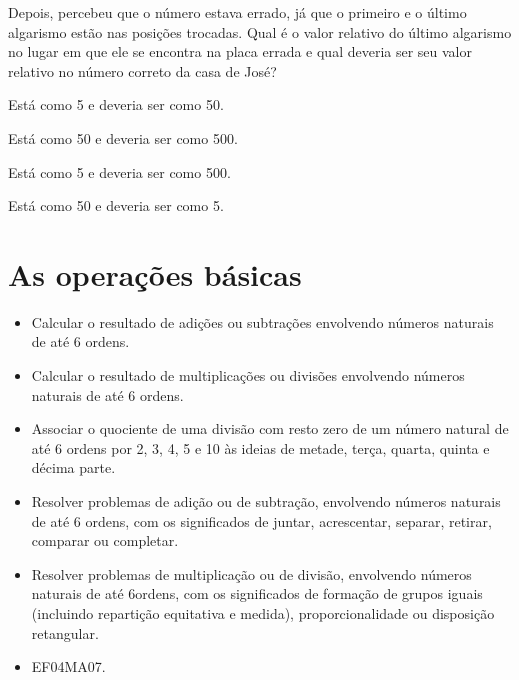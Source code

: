 Depois, percebeu que o número estava
errado, já que o primeiro e o último algarismo estão nas posições
trocadas. Qual é o valor relativo do último algarismo no lugar em que ele se
encontra na placa errada e qual deveria ser seu valor relativo no número
correto da casa de José?

\begin{escolha}
\item
  Está como 5 e deveria ser como 50.
\item
  Está como 50 e deveria ser como 500.
\item
  Está como 5 e deveria ser como 500.
\item
  Está como 50 e deveria ser como 5.
\end{escolha}

\chapter{As operações básicas}


\begin{itemize}
\item Calcular o resultado de adições ou subtrações envolvendo números
naturais de até 6 ordens.
\item Calcular o resultado de multiplicações ou divisões envolvendo números
naturais de até 6 ordens.
\item Associar o quociente de uma divisão com resto zero de um número
natural de até 6 ordens por 2, 3, 4, 5 e 10 às ideias de metade, terça,
quarta, quinta e décima parte.
\item Resolver problemas de adição ou de subtração, envolvendo números
naturais de até 6 ordens, com os significados de juntar, acrescentar,
separar, retirar, comparar ou completar.
\item Resolver problemas de multiplicação ou de divisão, envolvendo números
naturais de até 6ordens, com os significados de formação de grupos
iguais (incluindo repartição equitativa e medida), proporcionalidade ou
disposição retangular.
\end{itemize}


\begin{itemize}
\item EF04MA07.
\end{itemize}

